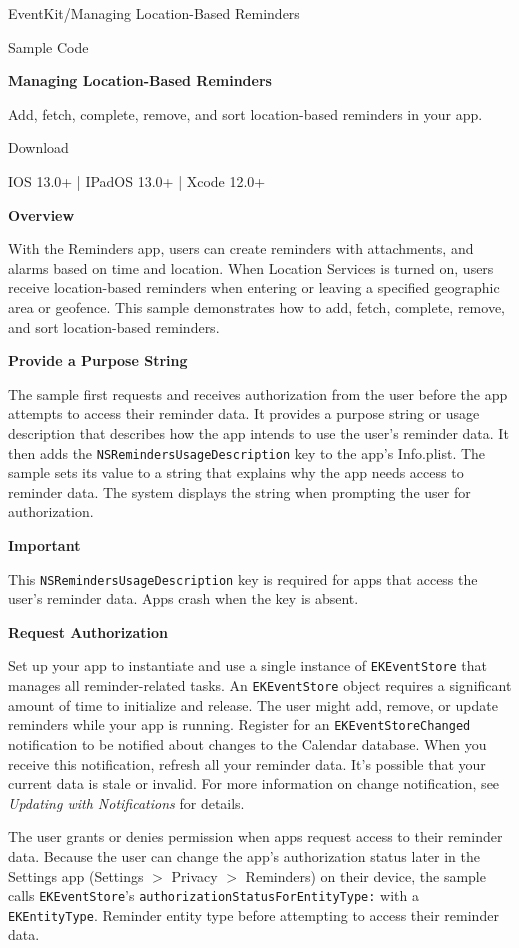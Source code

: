\documentclass{article}
\title{}
\author{}
\date{}
\begin{document}
EventKit/Managing Location-Based Reminders

Sample Code

\textbf{Managing Location-Based Reminders}

Add, fetch, complete, remove, and sort location-based reminders in your app.

Download

IOS 13.0+ | IPadOS 13.0+ | Xcode 12.0+

\textbf{Overview}

With the Reminders app, users can create reminders with attachments, and alarms based on time and location.
When Location Services is turned on, users receive location-based reminders when entering or leaving a
specified geographic area or geofence. This sample demonstrates how to add, fetch, complete, remove, and sort
location-based reminders.

\textbf{Provide a Purpose String}

The sample first requests and receives authorization from the user before the app attempts to access their
reminder data. It provides a purpose string or usage description that describes how the app intends to use the
user's reminder data. It then adds the \texttt{NSRemindersUsageDescription} key to the app's Info.plist. The
sample sets its value to a string that explains why the app needs access to reminder data. The system displays
the string when prompting the user for authorization.

\textbf{Important}

This \texttt{NSRemindersUsageDescription} key is required for apps that access the user's reminder data.
Apps crash when the key is absent.

\textbf{Request Authorization}

Set up your app to instantiate and use a single instance of \texttt{EKEventStore} that manages all reminder-related
tasks. An \texttt{EKEventStore} object requires a significant amount of time to initialize and release. The user might
add, remove, or update reminders while your app is running. Register for an \texttt{EKEventStoreChanged} notification
to be notified about changes to the Calendar database. When you receive this notification, refresh all your
reminder data. It's possible that your current data is stale or invalid. For more information on change notification,
see \textit{Updating with Notifications} for details.

The user grants or denies permission when apps request access to their reminder data. Because the user can
change the app's authorization status later in the Settings app (Settings $>$ Privacy $>$ Reminders) on their device,
the sample calls \texttt{EKEventStore}'s \texttt{authorizationStatusForEntityType:} with a \texttt{EKEntityType}.
Reminder entity type before attempting to access their reminder data.
\end{document}
